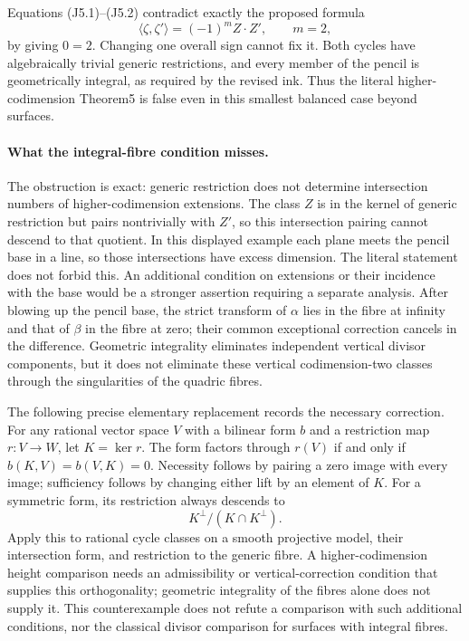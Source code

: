 Equations (J5.1)--(J5.2) contradict exactly the proposed formula
\[
             \langle\zeta,\zeta'\rangle
                       =(-1)^m Z\cdot Z',
                  \qquad m=2,
\]
by giving $0=2$. Changing one overall sign cannot fix it.
Both cycles have algebraically trivial generic restrictions, and
every member of the pencil is geometrically integral, as required
by the revised ink. Thus the literal higher-codimension Theorem5
is false even in this smallest balanced case beyond surfaces.

\paragraph{What the integral-fibre condition misses.}
The obstruction is exact: generic restriction does not determine
intersection numbers of higher-codimension extensions. The class
$Z$ is in the kernel of generic restriction but pairs nontrivially with $Z'$,
so this intersection pairing cannot descend to that quotient.
In this displayed example each plane meets the pencil base in a line,
so those intersections have excess dimension. The literal statement
does not forbid this. An additional condition on extensions or their
incidence with the base would be a stronger assertion requiring a
separate analysis. After blowing up the pencil base, the strict transform of $\alpha$
lies in the fibre at infinity and that of $\beta$ in the fibre at
zero; their common exceptional correction cancels in the difference.
Geometric integrality eliminates independent vertical divisor
components, but it does not eliminate these vertical codimension-two
classes through the singularities of the quadric fibres.

The following precise elementary replacement records the necessary
correction. For any rational vector space $V$ with a bilinear form
$b$ and a restriction map $r:V\to W$, let $K=\ker r$.
The form factors through $r(V)$ if and only if
$b(K,V)=b(V,K)=0$. Necessity follows by pairing a zero image with
every image; sufficiency follows by changing either lift by an
element of $K$. For a symmetric form, its restriction always
descends to
\[
                K^\perp/(K\cap K^\perp).
\]
Apply this to rational cycle classes on a smooth projective model,
their intersection form, and restriction to the generic fibre.
A higher-codimension height comparison needs an admissibility or
vertical-correction condition that supplies this orthogonality;
geometric integrality of the fibres alone does not supply it.
This counterexample does not refute a comparison with such
additional conditions, nor the classical divisor comparison for
surfaces with integral fibres.

